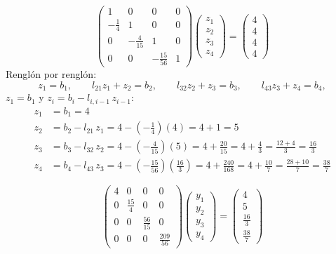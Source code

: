 \[
\begin{pmatrix} 1 & 0 & 0 & 0\\[3pt] -\frac14 & 1 & 0 & 0\\[3pt] 0 & -\frac{4}{15} & 1 & 0\\[3pt] 0 & 0 & -\frac{15}{56} & 1 \end{pmatrix}
\begin{pmatrix} z_1\\ z_2\\ z_3\\ z_4 \end{pmatrix}
= \begin{pmatrix} 4\\ 4\\ 4\\ 4 \end{pmatrix}
\]
Renglón por renglón:
\[
z_1 = b_1, \qquad l_{21}z_1 + z_2 = b_2, \qquad l_{32}z_2 + z_3 = b_3, \qquad l_{43}z_3 + z_4 = b_4,
\]
$z_1 = b_1$ y $z_i = b_i - l_{i,i-1}\,z_{i-1}$:
\begin{align*}
	z_1 &= b_1 = 4\\
	z_2 &= b_2 - l_{21}\,z_1 = 4 - \left(-\tfrac14\right)(4) = 4 + 1 = 5\\
	z_3 &= b_3 - l_{32}\,z_2 = 4 - \left(-\tfrac{4}{15}\right)(5) = 4 + \tfrac{20}{15} = 4 + \tfrac43 = \tfrac{12 + 4}{3} = \tfrac{16}{3}\\
	z_4 &= b_4 - l_{43}\,z_3 = 4 - \left(-\tfrac{15}{56}\right)\left(\tfrac{16}{3}\right) = 4 + \tfrac{240}{168} = 4 + \tfrac{10}{7} = \tfrac{28 + 10}{7} = \tfrac{38}{7}
\end{align*}


\[
\begin{pmatrix} 4 & 0 & 0 & 0\\[3pt] 0 & \frac{15}{4} & 0 & 0\\[3pt] 0 & 0 & \frac{56}{15} & 0\\[3pt] 0 & 0 & 0 & \frac{209}{56} \end{pmatrix}
\begin{pmatrix} y_1\\ y_2\\ y_3\\ y_4 \end{pmatrix}
= \begin{pmatrix} 4\\[3pt] 5\\[3pt] \frac{16}{3}\\[3pt] \frac{38}{7} \end{pmatrix}
\]

